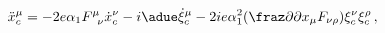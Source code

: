 \begin{equation}
\ddot{x}_c^\mu=-2e\alpha_1
F^\mu_{\phantom{\mu}\nu}\dot{x}^\nu_c-i\adue\dot{\xi}^\mu_c-2ie
\alpha_1^2(\fraz\partial{\partial x_\mu}
F_{\nu\rho})\xi^\nu_c\xi^\rho_c\,,
\end{equation}

